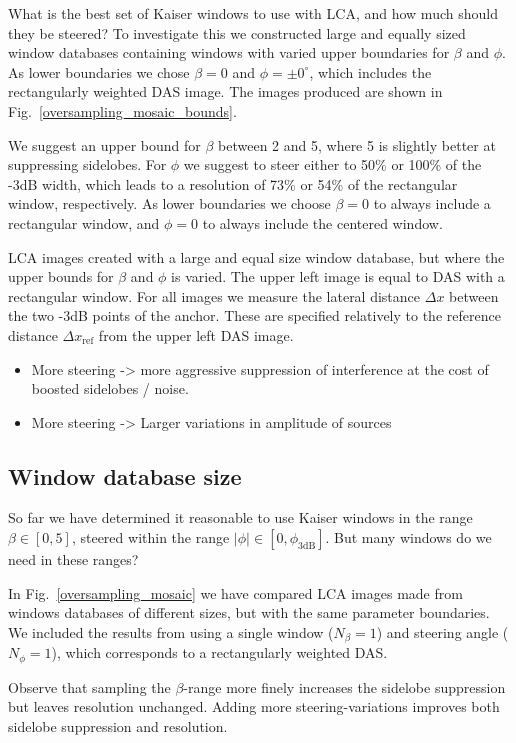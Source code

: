 \documentclass[10pt,journal,draftclsnofoot,onecolumn]{IEEEtran}
\newcommand\Fig[1]{Fig.~\ref{#1}}
\newcommand\1{\vec 1}
\begin{document}
What is the best set of Kaiser windows to use with LCA, and how much should they be steered? To investigate this we constructed large and equally sized window databases containing windows with varied upper boundaries for $\beta$ and $\phi$. As lower boundaries we chose $\beta=0$ and $\phi=\pm0^\circ$, which includes the rectangularly weighted DAS image. The images produced are shown in \Fig{oversampling_mosaic_bounds}.

We suggest an upper bound for $\beta$ between 2 and 5, where 5 is slightly better at suppressing sidelobes. For $\phi$ we suggest to steer either to 50\% or 100\% of the -3dB width, which leads to a resolution of 73\% or 54\% of the rectangular window, respectively. As lower boundaries we choose $\beta=0$ to always include a rectangular window, and $\phi=0$ to always include the centered window.

LCA images created with a large and equal size window database, but where the upper bounds for $\beta$ and $\phi$ is varied. The upper left image is equal to DAS with a rectangular window. For all images we measure the lateral distance $\Delta x$ between the two -3dB points of the anchor. These are specified relatively to the reference distance  $\Delta x_\text{ref}$ from the upper left DAS image.

\begin{itemize}
\item More steering -> more aggressive suppression of interference at the cost of boosted sidelobes / noise.
\item More steering -> Larger variations in amplitude of sources
\end{itemize}


\subsection{Window database size}\label{lca_database_size}

So far we have determined it reasonable to use Kaiser windows in the range $\beta\in[0,5]$, steered within the range $|\phi|\in[0,\phi_\mathrm{3dB}]$. But many windows do we need in these ranges?

In \Fig{oversampling_mosaic} we have compared LCA images made from windows databases of different sizes, but with the same parameter boundaries. We included the results from using a single window ($N_\beta=1$) and steering angle ($N_\phi=1$), which corresponds to a rectangularly weighted DAS.

Observe that sampling the $\beta$-range more finely increases the sidelobe suppression but leaves resolution unchanged. Adding more steering-variations improves both sidelobe suppression and resolution.
\end{document}
